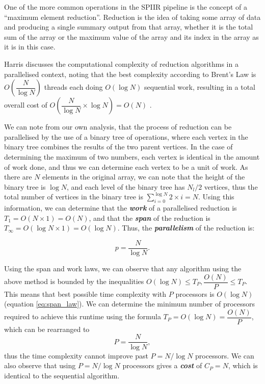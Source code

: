 \documentclass{article}
\begin{document}
One of the more common operations in the SPIIR pipeline is the concept of a ``maximum element reduction''.
Reduction is the idea of taking some array of data and producing a single summary output from that array, whether it is the total sum of the array or the maximum value of the array and its index in the array as it is in this case.

Harris discusses the computational complexity of reduction algorithms in a parallelised context, noting that the best complexity according to Brent's Law is \(O(\dfrac{N}{\log N})\) threads each doing \(O(\log N)\) sequential work, resulting in a total overall cost of \(O(\dfrac{N}{\log N}\times{\log N}) = O(N)\) \cite{reduction}.

We can note from our own analysis, that the process of reduction can be parallelised by the use of a binary tree of operations, where each vertex in the binary tree combines the results of the two parent vertices.
In the case of determining the maximum of two numbers, each vertex is identical in the amount of work done, and thus we can determine each vertex to be a unit of work.
As there are \(N\) elements in the original array, we can note that the height of the binary tree is \(\log N\), and each level of the binary tree has \(N_l/2\) vertices, thus the total number of vertices in the binary tree is \(\sum_{i=0}^{\log N}{2\times{i}} = N\).
Using this information, we can determine that the \textit{\textbf{work}} of a parallelised reduction is \(T_1 = O(N\times1) = O(N)\), and that the \textit{\textbf{span}} of the reduction is \(T_\infty = O(\log N \times {1}) = O(\log N)\).
Thus, the \textit{\textbf{parallelism}} of the reduction is:

\[
    p = \dfrac{N}{\log N}.
\]

Using the span and work laws, we can observe that any algorithm using the above method is bounded by the inequalities \(O(\log N) \leq T_P, \dfrac{O(N)}{P} \leq T_P\).
This means that best possible time complexity with \(P\) processors is \(O(\log N)\) (equation \ref{eq:span_law}).
We can determine the minimum number of processors required to achieve this runtime using the formula \(T_P = O(\log N) = \dfrac{O(N)}{P}\), which can be rearranged to
\[
    P = \dfrac{N}{\log N},
\]
thus the time complexity cannot improve past \(P = N/\log N\) processors.
We can also observe that using \(P = N/\log N\) processors gives a \textit{\textbf{cost}} of \(C_P = N\), which is identical to the sequential algorithm.
\\
\end{document}
